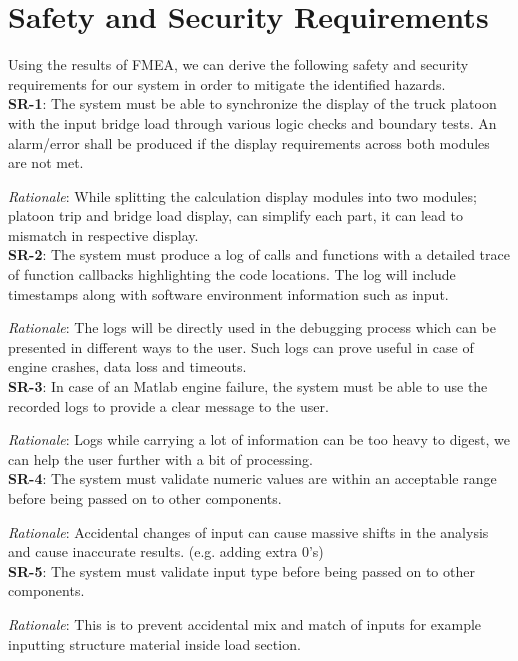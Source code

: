 \documentclass{article}
\begin{document}
      
 

\section{Safety and Security Requirements}
Using the results of FMEA, we can derive the following safety and security requirements for our system in order to mitigate the identified hazards. \\

\textbf{SR-1}:
The system must be able to synchronize the display of the truck platoon with the input bridge load through various logic checks and boundary tests. An alarm/error shall be produced if the display requirements across both modules are not met. 

\emph{Rationale}: While splitting the calculation display modules into two modules; platoon trip and bridge load display, can simplify each part, it can lead to mismatch in respective display.\\

\textbf{SR-2}: 
The system must produce a log of calls and functions with a detailed trace of function callbacks highlighting the code locations. The log will include timestamps along with software environment information such as input.

\emph{Rationale}:
The logs will be directly used in the debugging process which can be presented in different ways to the user. Such logs can prove useful in case of engine crashes, data loss and timeouts. \\

\textbf{SR-3}:
In case of an Matlab engine failure, the system must be able to use the recorded logs to provide a clear message to the user.

\emph{Rationale}: Logs while carrying a lot of information can be too heavy to digest, we can help the user further with a bit of processing.\\ 

\textbf{SR-4}:
The system must validate numeric values are within an acceptable range before being passed on to other components.

\emph{Rationale}: Accidental changes of input can cause massive shifts in the analysis and cause inaccurate results. (e.g. adding extra 0’s) \\

\textbf{SR-5}:
The system must validate input type before being passed on to other components.

\emph{Rationale}: This is to prevent accidental mix and match of inputs for example inputting structure material inside load section.\\
\end{document}
